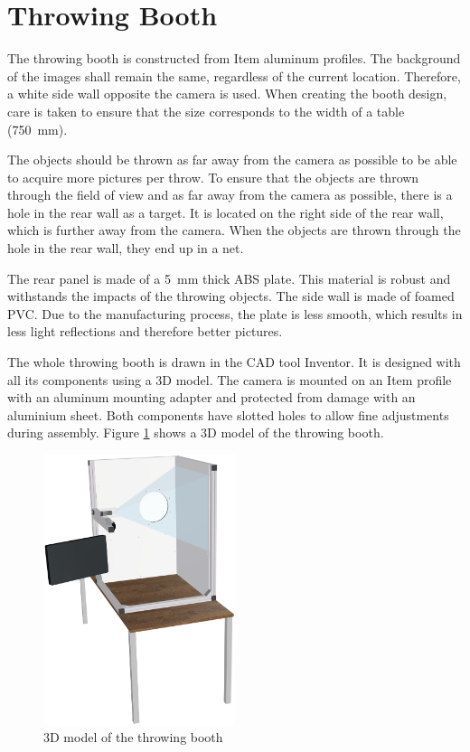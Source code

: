 \section{Throwing Booth}
\label{sec:hardware:throwing_booth}

The throwing booth is constructed from Item aluminum profiles.
The background of the images shall remain the same, regardless of the current location.
Therefore, a white side wall opposite the camera is used.
When creating the booth design, care is taken to ensure that the size corresponds to the width of a table (\SI{750}{mm}).

The objects should be thrown as far away from the camera as possible to be able to acquire more pictures per throw.
To ensure that the objects are thrown through the field of view and as far away from the camera as possible, there is a hole in the rear wall as a target.
It is located on the right side of the rear wall, which is further away from the camera.
When the objects are thrown through the hole in the rear wall, they end up in a net.

The rear panel is made of a \SI{5}{mm} thick ABS plate.
This material is robust and withstands the impacts of the throwing objects.
The side wall is made of foamed PVC.
Due to the manufacturing process, the plate is less smooth, which results in less light reflections and therefore better pictures.

The whole throwing booth is drawn in the CAD tool Inventor. It is designed with all its components using a 3D model.
The camera is mounted on an Item profile with an aluminum mounting adapter and protected from damage with an aluminium sheet.
Both components have slotted holes to allow fine adjustments during assembly.
Figure \ref{fig:booth} shows a 3D model of the throwing booth. 

\begin{figure}[h]
	\centering
	\includegraphics[width=0.5\textwidth]{graphics/top_assembly.png}
	\caption{3D model of the throwing booth}
	\label{fig:booth}
\end{figure}
